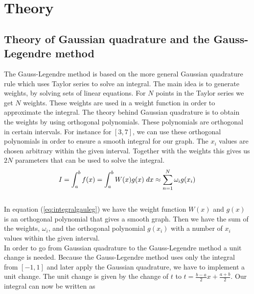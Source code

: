 \documentclass{article}
\begin{document}
\vspace{1cm}

\section{Theory} \label{sec:Theory}

\subsection{Theory of Gaussian quadrature and the Gauss-Legendre method}

The Gauss-Legendre method is based on the more general Gaussian quadrature rule which uses Taylor series to solve an integral. The main idea is to generate weights, by solving sets of linear equations. For $N$ points in the Taylor series we get $N$ weights. These weights are used in a weight function in order to approximate the integral. The theory behind Gaussian quadrature is to obtain the weights by using orthogonal polynomials. These polynomials are orthogonal in certain intervals. For instance for $[3,7]$, we can use these orthogonal polynomials in order to ensure a smooth integral for our graph. The $x_i$ values are chosen arbitrary within the given interval. Together with the weights this gives us $2N$ parameters that can be used to solve the integral. \\

\begin{equation} \label{eq:integralgauleg}
    I = \int_{a}^{b} f(x) = \int_{a}^{b}W(x)g(x) \hspace{1mm} dx \approx  \sum_{n=1}^{N}  \omega_i g(x_i)
\end{equation} \\

In equation (\ref{eq:integralgauleg}) we have the weight function $W(x)$ and $g(x)$ is an orthogonal polynomial that gives a smooth graph. Then we have the sum of the weights, $\omega_i$, and the orthogonal polynomial $g(x_i)$ with a number of $x_i$ values within the given interval. \\

In order to go from Gaussian quadrature to the Gauss-Legendre method a unit change is needed. Because the Gauss-Legendre method uses only the integral from $[-1,1]$ and later apply the Gaussian quadrature, we have to implement a unit change. The unit change is given by the change of $t$ to $t = \frac{b-a}{2}x + \frac{a+b}{2}$. Our integral can now be written as \\
\end{document}
